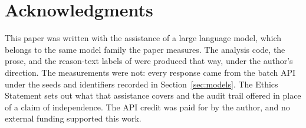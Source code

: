 \section*{Acknowledgments}
This paper was written with the assistance of a large language model, which
belongs to the same model family the paper measures. The analysis code, the
prose, and the reason-text labels of  were produced
that way, under the author's direction. The measurements were not: every
response came from the batch API under the seeds and identifiers recorded in
Section~\ref{sec:models}. The Ethics Statement sets out what that assistance
covers and the audit trail offered in place of a claim of independence. The
API credit was paid for by the author, and no external funding supported this
work.
